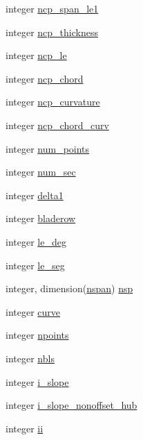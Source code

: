 \begin{DoxyCompactItemize}
\item 
integer \hyperlink{namespaceglobvar_a72b833451c2098e8e8b37605581558bd}{ncp\+\_\+span\+\_\+le1}
\item 
integer \hyperlink{namespaceglobvar_a6d8ea5ccd5fef3d661bbfae6de774947}{ncp\+\_\+thickness}
\item 
integer \hyperlink{namespaceglobvar_a092659d30270778769fb935306344024}{ncp\+\_\+le}
\item 
integer \hyperlink{namespaceglobvar_a8f6b996198f130f39452bc1a69c68081}{ncp\+\_\+chord}
\item 
integer \hyperlink{namespaceglobvar_a3dba06f407815715cf5e3ed177d016f0}{ncp\+\_\+curvature}
\item 
integer \hyperlink{namespaceglobvar_a909bbc8bd8371d224674230c41fbe759}{ncp\+\_\+chord\+\_\+curv}
\item 
integer \hyperlink{namespaceglobvar_a32ba7d06170614a028f4f4a10dd42764}{num\+\_\+points}
\item 
integer \hyperlink{namespaceglobvar_a0095cc9c0afc3e8507882537e5702411}{num\+\_\+sec}
\item 
integer \hyperlink{namespaceglobvar_a061aab1c7287a8dc09f346eee4a8bfc5}{delta1}
\item 
integer \hyperlink{namespaceglobvar_ae77b9f21d86127ac705b4176dd89f3e7}{bladerow}
\item 
integer \hyperlink{namespaceglobvar_a2f6ef0024a0f62256df6e067000712be}{le\+\_\+deg}
\item 
integer \hyperlink{namespaceglobvar_af945ae82373f900b43e4b1cad0b4c634}{le\+\_\+seg}
\item 
integer, dimension(\hyperlink{namespaceglobvar_adeb7d084c25deee7802eab03d40830c5}{nspan}) \hyperlink{namespaceglobvar_adba3978116210cab68543d6d1bed200e}{nsp}
\item 
integer \hyperlink{namespaceglobvar_a6f236c2395c2e66434a26a568bbe2e08}{curve}
\item 
integer \hyperlink{namespaceglobvar_aa41d6163f0ff719597e6db196ee482eb}{npoints}
\item 
integer \hyperlink{namespaceglobvar_a4c99273223ac940ff134ea785b89c7a8}{nbls}
\item 
integer \hyperlink{namespaceglobvar_aa918e1748c88e365a2bc9905e000fab4}{i\+\_\+slope}
\item 
integer \hyperlink{namespaceglobvar_a605576db34c829b3b1cdb2d8d549c1d3}{i\+\_\+slope\+\_\+nonoffset\+\_\+hub}
\item 
integer \hyperlink{namespaceglobvar_aca6734951fdbc5f2aa5cc26370f409b8}{ii}

\end{DoxyCompactItemize}
